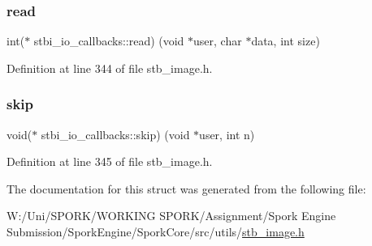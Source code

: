 \mbox{\label{structstbi__io__callbacks_a623e46b3a2a019611601409926283a88}} 
\subsubsection{\texorpdfstring{read}{read}}
{\footnotesize\ttfamily int($\ast$ stbi\+\_\+io\+\_\+callbacks\+::read) (void $\ast$user, char $\ast$data, int size)}



Definition at line 344 of file stb\+\_\+image.\+h.

\mbox{\label{structstbi__io__callbacks_a257aac5480a90a6c4b8fbe86c1b01068}} 
\subsubsection{\texorpdfstring{skip}{skip}}
{\footnotesize\ttfamily void($\ast$ stbi\+\_\+io\+\_\+callbacks\+::skip) (void $\ast$user, int n)}



Definition at line 345 of file stb\+\_\+image.\+h.



The documentation for this struct was generated from the following file\+:\begin{DoxyCompactItemize}
\item 
W\+:/\+Uni/\+S\+P\+O\+R\+K/\+W\+O\+R\+K\+I\+N\+G S\+P\+O\+R\+K/\+Assignment/\+Spork Engine Submission/\+Spork\+Engine/\+Spork\+Core/src/utils/\hyperlink{stb__image_8h}{stb\+\_\+image.\+h}\end{DoxyCompactItemize}

